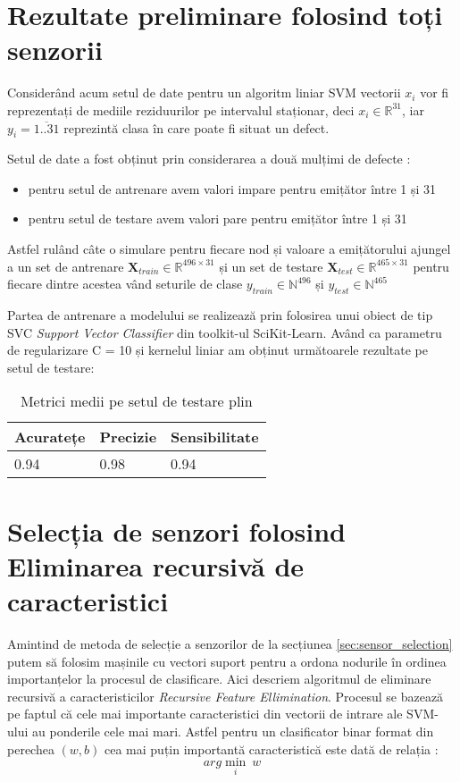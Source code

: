 \section{Rezultate preliminare folosind toți senzorii}

Considerând acum setul de date pentru un algoritm liniar SVM vectorii $x_i$ vor fi reprezentați de mediile reziduurilor pe intervalul staționar, deci $x_i \in \mathbb{R}^{31}$, iar $y_{i} = \overline{1..31}$ reprezintă clasa în care poate fi situat un defect.

Setul de date a fost obținut prin considerarea a două mulțimi de defecte \cite{irofti2017dictionary}:
\begin{itemize}
    \item pentru setul de antrenare avem valori impare pentru emițător între 1 și 31
    \item pentru setul de testare avem valori pare pentru emițător între 1 și 31
\end{itemize}

Astfel rulând câte o simulare pentru fiecare nod și valoare a emițătorului ajungel a un set de antrenare $\mathbf{X}_{train} \in \mathbb{R}^{496\times 31}$ și un set de testare $\mathbf{X}_{test} \in \mathbb{R}^{465\times 31}$ pentru fiecare dintre acestea vând seturile de clase $y_{train} \in \mathbb{N}^{496}$ și $y_{test} \in \mathbb{N}^{465}$

Partea de antrenare a modelului se realizează prin folosirea unui obiect de tip SVC \textit{Support Vector Classifier} din toolkit-ul SciKit-Learn. Având ca parametru de regularizare C = 10 și kernelul liniar am obținut următoarele rezultate pe setul de testare:

\begin{table}[h]
\centering
\begin{tabular}{ |p{3cm}|p{3cm}|p{3cm}|}
\hline
Acuratețe & Precizie & Sensibilitate\\
 \hline
0.94    &  0.98     & 0.94 \\
 \hline
\end{tabular}
\caption{Metrici medii pe setul de testare plin}
\label{tbl:full_sensor_results}
\end{table}


\section{Selecția de senzori folosind Eliminarea recursivă de caracteristici}
Amintind de metoda de selecție a senzorilor de la secțiunea \ref{sec:sensor_selection} putem să folosim mașinile cu vectori suport pentru a ordona nodurile în ordinea importanțelor la procesul de clasificare. Aici descriem algoritmul de eliminare recursivă a caracteristicilor \textit{Recursive Feature Ellimination}. Procesul se bazează pe faptul că cele mai importante caracteristici din vectorii de intrare ale SVM-ului au ponderile cele mai mari. Astfel pentru un clasificator binar format din perechea $(w, b)$ cea mai puțin importantă caracteristică este dată de relația \cite{RFE_PAPER}: 
\begin{equation}
    arg\min_{i} ~ w
\end{equation}


